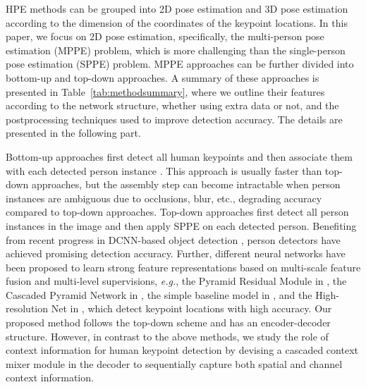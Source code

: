 \documentclass[twocolumn]{svjour3}          \smartqed  \usepackage{natbib}
\begin{document}
HPE methods can be grouped into 2D pose estimation \citep{rogez2012fast,toshev2014deeppose, newell2016stacked, fang2017rmpe, huang2017coarse, cao2017realtime, yang2017learning, xiao2018simple, sun2018integral, chen2018cascaded, sun2019deep, zhang2019human, li2019rethinking, girdhar2018detect} and 3D pose estimation \citep{rogez2012fast,pavlakos2018learning, pavlakos2018ordinal, rhodin2018unsupervised, hossain2018exploiting, yang20183d} according to the dimension of the coordinates of the keypoint locations. In this paper, we focus on 2D pose estimation, specifically, the multi-person pose estimation (MPPE) problem, which is more challenging than the single-person pose estimation (SPPE) problem. MPPE approaches can be further divided into bottom-up and top-down approaches. A summary of these approaches is presented in Table~\ref{tab:methodsummary}, where we outline their features according to the network structure, whether using extra data or not, and the postprocessing techniques used to improve detection accuracy. The details are presented in the following part.

Bottom-up approaches first detect all human keypoints and then associate them with each detected person instance \citep{cao2017realtime,newell2017associative,pishchulin2016deepcut}. This approach is usually faster than top-down approaches, but the assembly step can become intractable when person instances are ambiguous due to occlusions, blur, etc., degrading accuracy compared to top-down approaches. Top-down approaches first detect all person instances in the image and then apply SPPE on each detected person. Benefiting from recent progress in DCNN-based object detection \citep{ren2015faster, ouyang2016learning, he2017mask, lin2017feature, liu2020deep,chen2020recursive}, person detectors have achieved promising detection accuracy. Further, different neural networks have been proposed to learn strong feature representations based on multi-scale feature fusion and multi-level supervisions, \emph{e.g.}, the Pyramid Residual Module in \citep{yang2017learning}, the Cascaded Pyramid Network in \citep{chen2018cascaded}, the simple baseline model in \citep{xiao2018simple}, and the High-resolution Net in \citep{sun2019deep}, which detect keypoint locations with high accuracy. Our proposed method follows the top-down scheme and has an encoder-decoder structure. However, in contrast to the above methods, we study the role of context information for human keypoint detection by devising a cascaded context mixer module in the decoder to sequentially capture both spatial and channel context information.
\end{document}
